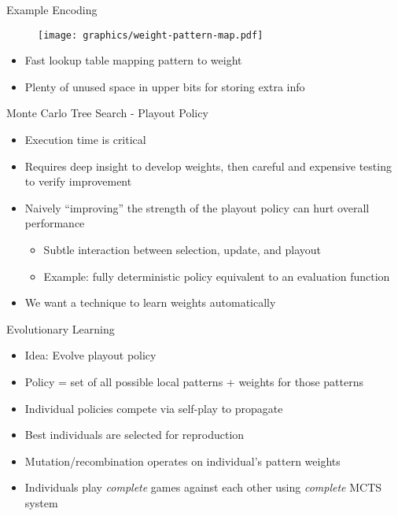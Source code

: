 \documentclass{beamer}
\begin{document}
\begin{frame}{Example Encoding}
\begin{figure}
  \begin{center}
  \texttt{[image: graphics/weight-pattern-map.pdf]}
  \label{fig:encoding}
  \end{center}
\end{figure}
\begin{itemize}
	\item Fast lookup table mapping pattern to weight
	\item Plenty of unused space in upper bits for storing extra info
\end{itemize}
\end{frame}

\begin{frame}{Monte Carlo Tree Search - Playout Policy}
\begin{itemize}
	\item Execution time is critical
	\item Requires deep insight to develop weights, then careful and expensive testing to verify improvement
	\item Naively ``improving'' the strength of the playout policy can hurt overall performance
	\begin{itemize}
		\item Subtle interaction between selection, update, and playout
		\item Example: fully deterministic policy equivalent to an evaluation function
	\end{itemize}
	\item We want a technique to learn weights automatically
\end{itemize}
\end{frame}

\begin{frame}{Evolutionary Learning}
\begin{itemize}
	\item Idea: Evolve playout policy
	\item Policy = set of all possible local patterns + weights for those patterns
	\item Individual policies compete via self-play to propagate
	\item Best individuals are selected for reproduction
	\item Mutation/recombination operates on individual's pattern weights
	\item Individuals play \emph{complete} games against each other using \emph{complete} MCTS system
\end{itemize}
\end{frame}
\end{document}
